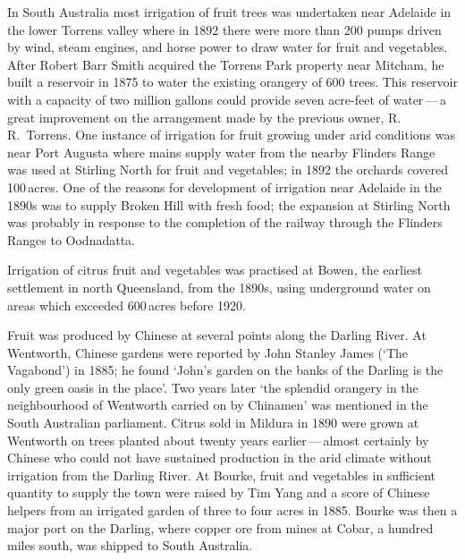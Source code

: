 In South Australia most irrigation of fruit trees was undertaken near
Adelaide in the lower Torrens valley  where in
1892 there were more than 200 pumps driven by wind, steam engines, and
horse power to draw water for fruit and vegetables.  After Robert Barr
Smith  acquired the Torrens Park  property near Mitcham,  he built a reservoir
 in
1875 to water the existing orangery of 600 trees.  This reservoir with
a capacity of two million gallons could provide seven acre-feet of
water\,---\,a great improvement on the arrangement made by the
previous owner, R.\,R.~Torrens.  One instance
of irrigation for fruit growing under arid conditions was near Port
Augusta  where mains supply water from the nearby
Flinders Range  was used at Stirling North
 for
fruit and vegetables; in 1892 the orchards covered 100\,acres.  One of
the reasons for development of irrigation near Adelaide in the 1890s was
to supply Broken Hill  with fresh food; the
expansion at Stirling North was probably in response to the completion
of the railway through the Flinders Ranges to
Oodnadatta.

Irrigation of citrus fruit and vegetables was practised at Bowen,
 the earliest settlement in north Queensland, from the
1890s, using underground water on areas which exceeded 600\,acres before
1920.

Fruit was produced by Chinese  at several points along
the Darling River.   At Wentworth,
 Chinese
gardens were reported by John Stanley James 
(`The Vagabond') in 1885; he found `John's garden on the banks of the
Darling is the only green oasis in the place'. Two years later `the
splendid orangery in the neighbourhood of Wentworth carried on by
Chinamen' was mentioned in the South Australian parliament.  Citrus
sold in Mildura  in 1890 were grown at Wentworth on
trees planted about twenty years earlier\,---\,almost certainly by
Chinese who could not have sustained production in the arid climate
without irrigation from the Darling River.  At
Bourke,  fruit and vegetables in sufficient quantity to
supply the town were raised by Tim Yang and a score of Chinese helpers
from an irrigated garden of three to four acres in 1885.  Bourke was
then a major port on the Darling, where copper ore from mines at
Cobar,
 a hundred miles south, was shipped to South
Australia.

